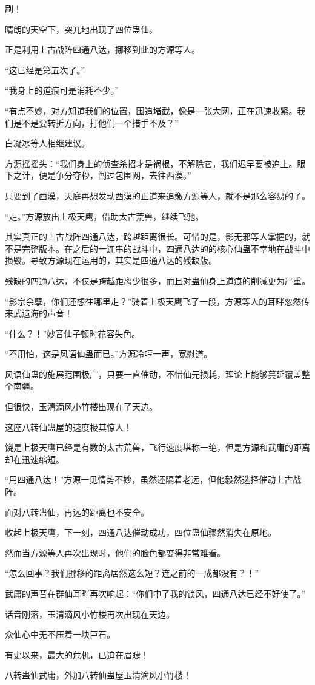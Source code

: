 \begin{this_body}
刷！

晴朗的天空下，突兀地出现了四位蛊仙。

正是利用上古战阵四通八达，挪移到此的方源等人。

“这已经是第五次了。”

“我身上的道痕可是消耗不少。”

“有点不妙，对方知道我们的位置，围追堵截，像是一张大网，正在迅速收紧。我们是不是要转折方向，打他们一个措手不及？”

白凝冰等人相继建议。

方源摇摇头：“我们身上的侦查杀招才是祸根，不解除它，我们迟早要被追上。眼下之计，便是争分夺秒，闯过包围网，去往西漠。”

只要到了西漠，天庭再想发动西漠的正道来追缴方源等人，就不是那么容易的了。

“走。”方源放出上极天鹰，借助太古荒兽，继续飞驰。

其实真正的上古战阵四通八达，跨越距离很长。可惜的是，影无邪等人掌握的，就不是完整版本。在之后的一连串的战斗中，四通八达的的核心仙蛊不幸地在战斗中损毁。导致方源现在运用的，其实是四通八达的残缺版。

残缺的四通八达，不仅是跨越距离少很多，而且对蛊仙身上道痕的削减更为严重。

“影宗余孽，你们还想往哪里走？”骑着上极天鹰飞了一段，方源等人的耳畔忽然传来武遗海的声音！

“什么？！”妙音仙子顿时花容失色。

“不用怕，这是风语仙蛊而已。”方源冷哼一声，宽慰道。

风语仙蛊的施展范围极广，只要一直催动，不惜仙元损耗，理论上能够蔓延覆盖整个南疆。

但很快，玉清滴风小竹楼出现在了天边。

这座八转仙蛊屋的速度极其惊人！

饶是上极天鹰已经是有数的太古荒兽，飞行速度堪称一绝，但是方源和武庸的距离却在迅速缩短。

“用四通八达！”方源一见情势不妙，虽然还隔着老远，但他毅然选择催动上古战阵。

面对八转蛊仙，再远的距离也不安全。

收起上极天鹰，下一刻，四通八达催动成功，四位蛊仙骤然消失在原地。

然而当方源等人再次出现时，他们的脸色都变得非常难看。

“怎么回事？我们挪移的距离居然这么短？连之前的一成都没有？！”

武庸的声音在群仙耳畔再次响起：“你们中了我的锁风，四通八达已经不好使了。”

话音刚落，玉清滴风小竹楼再次出现在天边。

众仙心中无不压着一块巨石。

有史以来，最大的危机，已迫在眉睫！

八转蛊仙武庸，外加八转仙蛊屋玉清滴风小竹楼！

\end{this_body}

